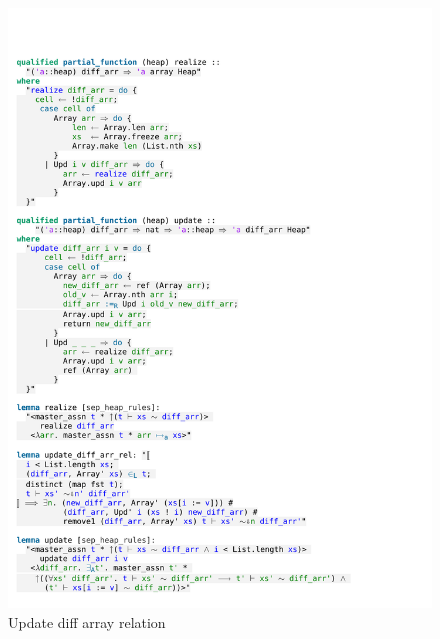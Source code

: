 \begin{figure}[htpb]
    \includegraphics[trim={0 4cm 0 21,8cm}, clip, width=1.00\textwidth]{figures/Theory_Diff_Arr_Update.pdf}
    \caption[Update diff array relation]{Update diff array relation}
    \label{fig:diff_arr_rel_update}
\end{figure}

